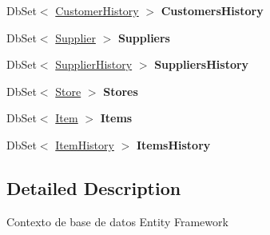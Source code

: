 \begin{DoxyCompactItemize}
Db\+Set$<$ \hyperlink{class_h_k_supply_1_1_models_1_1_customer_history}{Customer\+History} $>$ {\bfseries Customers\+History}
\item 
\mbox{\label{class_h_k_supply_1_1_d_b_1_1_h_k_supply_context_a870c6d0a70de14c62e02b6bfe1b2785b}} 
Db\+Set$<$ \hyperlink{class_h_k_supply_1_1_models_1_1_supplier}{Supplier} $>$ {\bfseries Suppliers}
\item 
\mbox{\label{class_h_k_supply_1_1_d_b_1_1_h_k_supply_context_ada724e6e20c06dd9140705bec14e0bcd}} 
Db\+Set$<$ \hyperlink{class_h_k_supply_1_1_models_1_1_supplier_history}{Supplier\+History} $>$ {\bfseries Suppliers\+History}
\item 
\mbox{\label{class_h_k_supply_1_1_d_b_1_1_h_k_supply_context_ad0850f9caf8c347b1ce8f263f9380352}} 
Db\+Set$<$ \hyperlink{class_h_k_supply_1_1_models_1_1_store}{Store} $>$ {\bfseries Stores}
\item 
\mbox{\label{class_h_k_supply_1_1_d_b_1_1_h_k_supply_context_ab1015fe597bcbd96bc09d305ecfd1bc7}} 
Db\+Set$<$ \hyperlink{class_h_k_supply_1_1_models_1_1_item}{Item} $>$ {\bfseries Items}
\item 
\mbox{\label{class_h_k_supply_1_1_d_b_1_1_h_k_supply_context_a7de5f8fe0e63bde4c3d100bce0daa591}} 
Db\+Set$<$ \hyperlink{class_h_k_supply_1_1_models_1_1_item_history}{Item\+History} $>$ {\bfseries Items\+History}
\end{DoxyCompactItemize}


\subsection{Detailed Description}
Contexto de base de datos Entity Framework 




